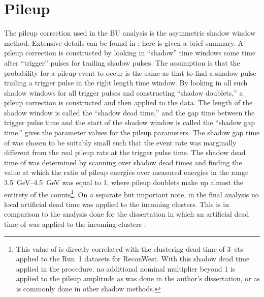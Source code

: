 
\graphicspath{{Body/Figures/Pileup/}{Body/Figures/Pileup/Amplitude/}{Body/Figures/Pileup/TimeShift/}{Body/Figures/Pileup/EnergyModel/}{Body/Figures/Pileup/TriplePileup/}{Body/Figures/Pileup/RateError/}}

\clearpage
\section{Pileup}

The pileup correction used in the BU analysis is the asymmetric shadow window method. Extensive details can be found in ; here is given a brief summary. A pileup correction is constructed by looking in ``shadow'' time windows some time after ``trigger'' pulses for trailing shadow pulses. The assumption is that the probability for a pileup event to occur is the same as that to find a shadow pulse trailing a trigger pulse in the right length time window. By looking in all such shadow windows for all trigger pulses and constructing ``shadow doublets,'' a pileup correction is constructed and then applied to the data. The length of the shadow window is called the ``shadow dead time,'' and the gap time between the trigger pulse time and the start of the shadow window is called the ``shadow gap time.''   gives the parameter values for the pileup parameters. The shadow gap time of  was chosen to be suitably small such that the event rate was marginally different from the real pileup rate at the trigger pulse time. The shadow dead time of  was determined by scanning over shadow dead times and finding the value at which the ratio of pileup energies over measured energies in the range \SIrange{3.5}{4.5}{\GeV} was equal to 1, where pileup doublets make up almost the entirety of the counts\footnote{This value of  is directly correlated with the clustering dead time of 3~cts applied to the Run~1 datasets for ReconWest. With this shadow dead time applied in the procedure, no additional nominal multiplier beyond 1 is applied to the pileup amplitude as was done in the author's dissertation, or as is commonly done in other shadow methods.}. On a separate but important note, in the final analysis no local artificial dead time was applied to the incoming clusters. This is in comparison to the analysis done for the dissertation in which an artificial dead time of  was applied to the incoming clusters \cite{phdthesis:2020Kinnaird}.



